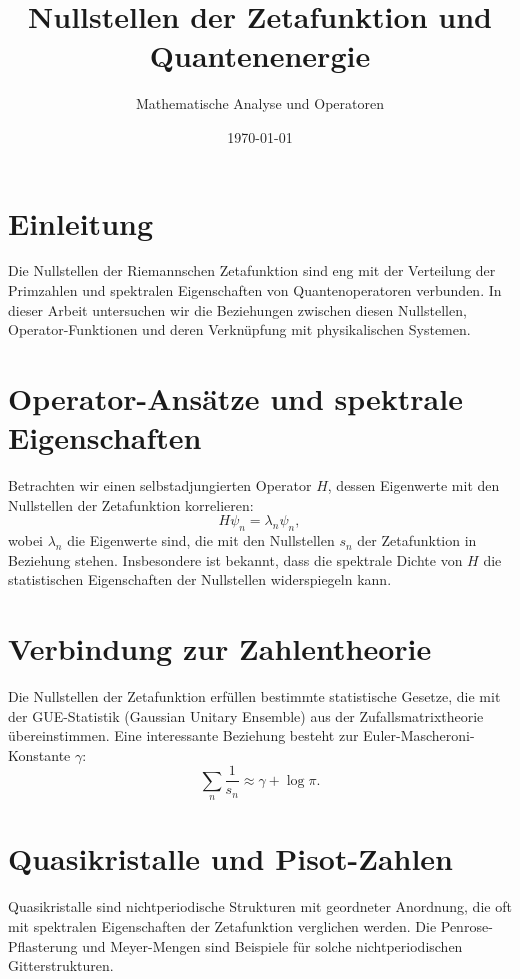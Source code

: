 \documentclass[a4paper,12pt]{article}
\title{Nullstellen der Zetafunktion und Quantenenergie}
\author{Mathematische Analyse und Operatoren}
\date{\today}
\begin{document}
\maketitle

\section{Einleitung}
Die Nullstellen der Riemannschen Zetafunktion sind eng mit der Verteilung der Primzahlen und spektralen Eigenschaften von Quantenoperatoren verbunden. In dieser Arbeit untersuchen wir die Beziehungen zwischen diesen Nullstellen, Operator-Funktionen und deren Verknüpfung mit physikalischen Systemen.

\section{Operator-Ansätze und spektrale Eigenschaften}
Betrachten wir einen selbstadjungierten Operator $H$, dessen Eigenwerte mit den Nullstellen der Zetafunktion korrelieren:
\begin{equation}
    H \psi_n = \lambda_n \psi_n,
\end{equation}
wobei $\lambda_n$ die Eigenwerte sind, die mit den Nullstellen $s_n$ der Zetafunktion in Beziehung stehen. Insbesondere ist bekannt, dass die spektrale Dichte von $H$ die statistischen Eigenschaften der Nullstellen widerspiegeln kann.

\section{Verbindung zur Zahlentheorie}
Die Nullstellen der Zetafunktion erfüllen bestimmte statistische Gesetze, die mit der GUE-Statistik (Gaussian Unitary Ensemble) aus der Zufallsmatrixtheorie übereinstimmen. Eine interessante Beziehung besteht zur Euler-Mascheroni-Konstante $\gamma$:
\begin{equation}
    \sum_{n} \frac{1}{s_n} \approx \gamma + \log \pi.
\end{equation}

\section{Quasikristalle und Pisot-Zahlen}
Quasikristalle sind nichtperiodische Strukturen mit geordneter Anordnung, die oft mit spektralen Eigenschaften der Zetafunktion verglichen werden. Die Penrose-Pflasterung und Meyer-Mengen sind Beispiele für solche nichtperiodischen Gitterstrukturen.
\end{document}
